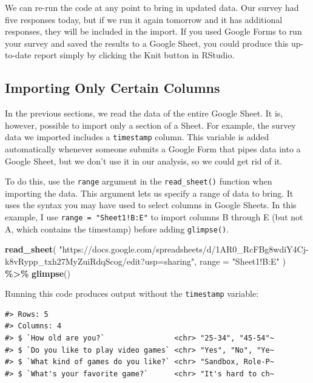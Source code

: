 \documentclass[
]{book}
\newenvironment{Shaded}{\begin{snugshade}}{\end{snugshade}}
\newcommand{\AttributeTok}[1]{\textcolor[rgb]{0.13,0.29,0.53}{#1}}
\newcommand{\FunctionTok}[1]{\textcolor[rgb]{0.13,0.29,0.53}{\textbf{#1}}}
\newcommand{\NormalTok}[1]{#1}
\newcommand{\SpecialCharTok}[1]{\textcolor[rgb]{0.81,0.36,0.00}{\textbf{#1}}}
\newcommand{\StringTok}[1]{\textcolor[rgb]{0.31,0.60,0.02}{#1}}
\begin{document}
We can re-run the code at any point to bring in updated data. Our survey had five responses today, but if we run it again tomorrow and it has additional responses, they will be included in the import. If you used Google Forms to run your survey and saved the results to a Google Sheet, you could produce this up-to-date report simply by clicking the Knit button in RStudio.

\hypertarget{importing-only-certain-columns}{%
\subsection*{Importing Only Certain Columns}\label{importing-only-certain-columns}}

In the previous sections, we read the data of the entire Google Sheet. It is, however, possible to import only a section of a Sheet. For example, the survey data we imported includes a \texttt{timestamp} column. This variable is added automatically whenever someone submits a Google Form that pipes data into a Google Sheet, but we don't use it in our analysis, so we could get rid of it.

To do this, use the \texttt{range} argument in the \texttt{read\_sheet()} function when importing the data. This argument lets us specify a range of data to bring. It uses the syntax you may have used to select columns in Google Sheets. In this example, I use \texttt{range\ =\ "Sheet1!B:E"} to import columns B through E (but not A, which contains the timestamp) before adding \texttt{glimpse()}.

\begin{Shaded}
\begin{Highlighting}[]
\FunctionTok{read\_sheet}\NormalTok{(}
  \StringTok{"https://docs.google.com/spreadsheets/d/1AR0\_RcFBg8wdiY4Cj{-}k8vRypp\_txh27MyZuiRdqScog/edit?usp=sharing"}\NormalTok{,}
  \AttributeTok{range =} \StringTok{"Sheet1!B:E"}
\NormalTok{) }\SpecialCharTok{\%\textgreater{}\%}
  \FunctionTok{glimpse}\NormalTok{()}
\end{Highlighting}
\end{Shaded}

Running this code produces output without the \texttt{timestamp} variable:

\begin{verbatim}
#> Rows: 5
#> Columns: 4
#> $ `How old are you?`                <chr> "25-34", "45-54"~
#> $ `Do you like to play video games` <chr> "Yes", "No", "Ye~
#> $ `What kind of games do you like?` <chr> "Sandbox, Role-P~
#> $ `What's your favorite game?`      <chr> "It's hard to ch~
\end{verbatim}
\end{document}
